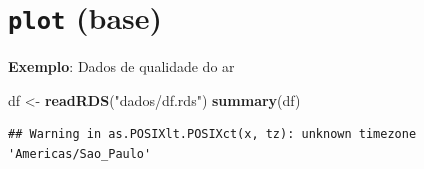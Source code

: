 \documentclass[]{book}
\newenvironment{Shaded}{\begin{snugshade}}{\end{snugshade}}
\newcommand{\KeywordTok}[1]{\textcolor[rgb]{0.13,0.29,0.53}{\textbf{#1}}}
\newcommand{\StringTok}[1]{\textcolor[rgb]{0.31,0.60,0.02}{#1}}
\newcommand{\NormalTok}[1]{#1}
\theoremstyle{definition}
\theoremstyle{definition}
\theoremstyle{definition}
\theoremstyle{remark}
\begin{document}
\section{\texorpdfstring{\texttt{plot}
(base)}{plot (base)}}\label{plot-base}

\textbf{Exemplo}: Dados de qualidade do ar

\begin{Shaded}
\begin{Highlighting}[]
\NormalTok{df <-}\StringTok{ }\KeywordTok{readRDS}\NormalTok{(}\StringTok{"dados/df.rds"}\NormalTok{)}
\KeywordTok{summary}\NormalTok{(df)}
\end{Highlighting}
\end{Shaded}

\begin{verbatim}
## Warning in as.POSIXlt.POSIXct(x, tz): unknown timezone 'Americas/Sao_Paulo'
\end{verbatim}
\end{document}
